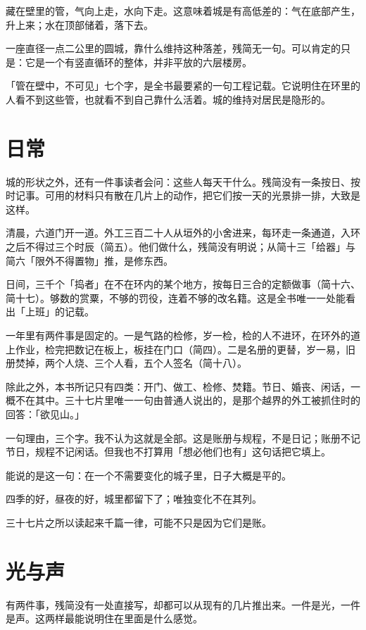 藏在壁里的管，气向上走，水向下走。这意味着城是有高低差的：气在底部产生，升上来；水在顶部储着，落下去。

一座直径一点二公里的圆城，靠什么维持这种落差，残简无一句。可以肯定的只是：它是一个有竖直循环的整体，并非平放的六层楼房。

「管在壁中，不可见」七个字，是全书最要紧的一句工程记载。它说明住在环里的人看不到这些管，也就看不到自己靠什么活着。城的维持对居民是隐形的\nobreak。

\section{日常}

城的形状之外，还有一件事读者会问：这些人每天干什么。残简没有一条按日、按时记事。可用的材料只有散在几片上的动作，把它们按一天的光景排一排，大致是这样。

清晨，六道门开一道。外工三百二十人从垣外的小舍进来，每环走一条通道，入环之后不得过三个时辰（简五）。他们做什么，残简没有明说；从简十三「给器」与简六「限外不得置物」推，是修东西。

日间，三千个「捣者」在不在环内的某个地方，按每日三合的定额做事（简十六、简十七）。够数的赏粟，不够的罚役，连着不够的改名籍。这是全书唯一一处能看出「上班」的记载。

一年里有两件事是固定的。一是气路的检修，岁一检，检的人不进环，在环外的道上作业，检完把数记在板上，板挂在门口（简四）。二是名册的更替，岁一易，旧册焚掉，两个人烧、三个人看，五个人签名（简十八）。

除此之外，本书所记只有四类：开门、做工、检修、焚籍。节日、婚丧、闲话，一概不在其中。三十七片里唯一一句由普通人说出的，是那个越界的外工被抓住时的回答：「欲见山。」

一句理由，三个字。我不认为这就是全部。这是账册与规程，不是日记；账册不记节日，规程不记闲话。但我也不打算用「想必他们也有」这句话把它填上。

能说的是这一句：在一个不需要变化的城子里，日子大概是平的。

四季的好，昼夜的好，城里都留下了；唯独变化不在其列。

三十七片之所以读起来千篇一律，可能不只是因为它们是账。

\section{光与声}

有两件事，残简没有一处直接写，却都可以从现有的几片推出来。一件是光，一件是声。这两样最能说明住在里面是什么感觉。

